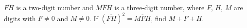 $\overline{FH}$ is a two-digit number and $\overline{MFH}$ is a three-digit number, where $F$, $H$, $M$ are digits with $F\ne0$ and $M\ne0$. If $\left(\overline{FH}\right)^2=\overline{MFH}$, find $M+F+H$.
